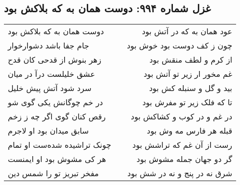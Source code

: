 \begin{center}
\section*{غزل شماره ۹۹۴: دوست همان به که بلاکش بود}
\label{sec:0994}
\begin{longtable}{l p{0.5cm} r}
دوست همان به که بلاکش بود
&&
عود همان به که در آتش بود
\\
جام جفا باشد دشوارخوار
&&
چون ز کف دوست بود خوش بود
\\
زهر بنوش از قدحی کان قدح
&&
از کرم و لطف منقش بود
\\
عشق خلیلست درآ در میان
&&
غم مخور ار زیر تو آتش بود
\\
سرد شود آتش پیش خلیل
&&
بید و گل و سنبله کش بود
\\
در خم چوگانش یکی گوی شو
&&
تا که فلک زیر تو مفرش بود
\\
رقص کنان گوی اگر چه ز زخم
&&
در غم و در کوب و کشاکش بود
\\
سابق میدان بود او لاجرم
&&
قبله هر فارس مه وش بود
\\
چونک تراشیده شده‌ست او تمام
&&
رست از آن غم که تراشش بود
\\
هر کی مشوش بود او ایمنست
&&
گر دو جهان جمله مشوش بود
\\
مفخر تبریز تو را شمس دین
&&
شرق نه در پنج و نه در شش بود
\\
\end{longtable}
\end{center}
